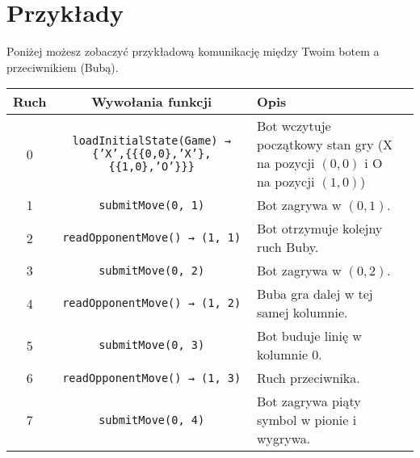\documentclass{spiral}
\begin{document}
\section{Przykłady}

\noindent Poniżej możesz zobaczyć przykładową komunikację między Twoim botem a przeciwnikiem (Bubą).

\begin{center}
	\renewcommand{\arraystretch}{1.4}
	\begin{tabular}{|c|c|p{6cm}|p{4.5cm}|}
		\hline
		\textbf{Ruch} & \textbf{Wywołania funkcji}                                                    & \textbf{Opis}                                                                  \\
		\hline
		0             & \texttt{loadInitialState(Game) → \{'X',\{\{\{0,0\},'X'\},\{\{1,0\},'O'\}\}\}} & Bot wczytuje początkowy stan gry (X na pozycji $(0,0)$ i O na pozycji $(1,0)$) \\
		\hline
		1             & \texttt{submitMove(0, 1)}                                                     & Bot zagrywa w $(0, 1)$.                                                        \\
		\hline
		2             & \texttt{readOpponentMove() → (1, 1)}                                          & Bot otrzymuje kolejny ruch Buby.                                               \\
		\hline
		3             & \texttt{submitMove(0, 2)}                                                     & Bot zagrywa w $(0, 2)$.                                                        \\
		\hline
		4             & \texttt{readOpponentMove() → (1, 2)}                                          & Buba gra dalej w tej samej kolumnie.                                           \\
		\hline
		5             & \texttt{submitMove(0, 3)}                                                     & Bot buduje linię w kolumnie 0.                                                 \\
		\hline
		6             & \texttt{readOpponentMove() → (1, 3)}                                          & Ruch przeciwnika.                                                              \\
		\hline
		7             & \texttt{submitMove(0, 4)}                                                     & Bot zagrywa piąty symbol w pionie i wygrywa.                                   \\
		\hline
	\end{tabular}
\end{center}
\end{document}
